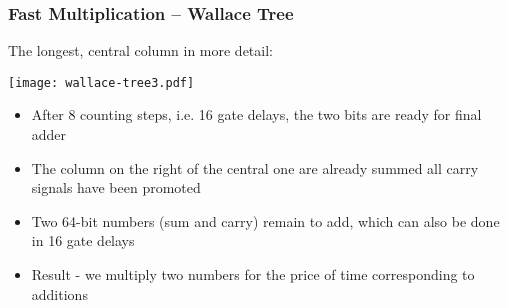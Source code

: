 \documentclass{beamer}
\begin{document}
\begin{frame}[shrink=5]
\frametitle{Fast Multiplication -- Wallace Tree}

The longest, central column in more detail:
\begin{center}
\texttt{[image: wallace-tree3.pdf]}
\end{center}

\begin{itemize}
\item After 8 counting steps, i.e. 16 gate delays, the two bits are ready for final adder
\item The column on the right of the central one are already summed all carry signals have been promoted
\item Two 64-bit numbers (sum and carry) remain to add, which can also be done in 16 gate delays
\item Result - we multiply two numbers for the price of time corresponding to additions
\end{itemize}

\end{frame}
\end{document}
